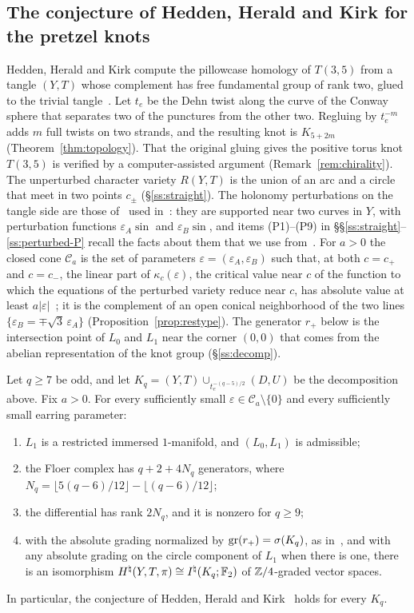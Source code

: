 \subsection{The conjecture of Hedden, Herald and Kirk for the pretzel knots}
Hedden, Herald and Kirk compute the pillowcase homology of $T(3,5)$ from a tangle $(Y,T)$ whose
complement has free fundamental group of rank two, glued to the trivial tangle~\cite[\S\S10--11]{HHK2}.
Let $t_e$ be the Dehn twist along the curve of the Conway sphere that separates two of the punctures from
the other two. Regluing by $t_e^{-m}$ adds $m$ full twists on two strands, and the resulting knot is
$K_{5+2m}$ (Theorem~\ref{thm:topology}). That the original gluing gives the positive torus knot $T(3,5)$ is verified by a
computer-assisted argument (Remark~\ref{rem:chirality}). The unperturbed character variety $R(Y,T)$ is the union
of an arc and a circle that meet in two points $c_\pm$ (\S\ref{ss:straight}). The holonomy perturbations on the
tangle side are those of~\cite[\S10]{HHK2} used in~\cite{WuebbenV}: they are supported near two curves in $Y$,
with perturbation functions $\varepsilon_A\sin$ and $\varepsilon_B\sin$, and items (P1)--(P9) in
\S\S\ref{ss:straight}--\ref{ss:perturbed-P} recall the facts about them that we use from~\cite{WuebbenV}. For $a>0$ the closed cone
$\mathcal C_a$ is the set of parameters $\varepsilon=(\varepsilon_A,\varepsilon_B)$ such that, at both $c=c_+$ and $c=c_-$, the
linear part of $\kappa_c(\varepsilon)$, the critical value near $c$ of the function to which the equations of the
perturbed variety reduce near $c$, has absolute value at least $a|\varepsilon|$~\cite[Def.~5.5]{WuebbenV}; it is the
complement of an open conical neighborhood of the two lines $\{\varepsilon_B=\mp\sqrt3\,\varepsilon_A\}$
(Proposition~\ref{prop:restype}). The generator $r_+$ below is the intersection point of $L_0$ and $L_1$ near the
corner $(0,0)$ that comes from the abelian representation of the knot group (\S\ref{ss:decomp}).

\begin{theorem}\label{thm:hhk}
Let $q\ge7$ be odd, and let $K_q=(Y,T)\cup_{t_e^{-(q-5)/2}}(D,U)$ be the decomposition above. Fix $a>0$.
For every sufficiently small $\varepsilon\in\mathcal C_a\setminus\{0\}$ and every sufficiently small earring
parameter:
\begin{enumerate}
\item $L_1$ is a restricted immersed $1$-manifold, and $(L_0,L_1)$ is admissible;
\item the Floer complex has $q+2+4N_q$ generators, where $N_q=\lfloor 5(q-6)/12\rfloor-\lfloor(q-6)/12\rfloor$;
\item the differential has rank $2N_q$, and it is nonzero for $q\ge9$;
\item with the absolute grading normalized by $\operatorname{gr}(r_+)=\sigma(K_q)$, as in~\cite[(19)]{HHK2}, and with any absolute grading on the circle component of $L_1$ when there is one, there is an isomorphism $H^{\natural}(Y,T,\pi)\cong I^{\natural}(K_q;\mathbb{F}_2)$ of $\mathbb{Z}/4$-graded vector spaces.
\end{enumerate}
In particular, the conjecture of Hedden, Herald and Kirk~\cite[Conj.~6.5]{HHK2} holds for every $K_q$.
\end{theorem}

